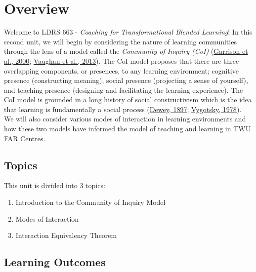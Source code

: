 \documentclass[
]{book}
\providecommand{\tightlist}{%
  \setlength{\itemsep}{0pt}\setlength{\parskip}{0pt}}
\begin{document}
\hypertarget{overview}{%
\section*{Overview}\label{overview}}

Welcome to LDRS 663 - \emph{Coaching for Transformational Blended Learning}! In this second unit, we will begin by considering the nature of learning communities through the lens of a model called the \emph{Community of Inquiry (CoI)} (\href{https://www.sciencedirect.com/science/article/pii/S1096751600000166?}{Garrison et al., 2000}; \href{http://www.aupress.ca/index.php/books/120229}{Vaughan et al., 2013}). The CoI model proposes that there are three overlapping components, or presences, to any learning environment; cognitive presence (constructing meaning), social presence (projecting a sense of yourself), and teaching presence (designing and facilitating the learning experience). The CoI model is grounded in a long history of social constructivism which is the idea that learning is fundamentally a social process (\href{https://en.wikisource.org/wiki/My_Pedagogic_Creed}{Dewey, 1897}; \href{https://twu.idm.oclc.org/login?url=http://search.ebscohost.com/login.aspx?direct=true\&db=cat05965a\&AN=alc.191437\&site=eds-live}{Vygotsky, 1978}). We will also consider various modes of interaction in learning environments and how these two models have informed the model of teaching and learning in TWU FAR Centres.

\hypertarget{topics}{%
\subsection*{Topics}\label{topics}}

This unit is divided into 3 topics:

\begin{enumerate}
\def\labelenumi{\arabic{enumi}.}
\tightlist
\item
  Introduction to the Community of Inquiry Model\\
\item
  Modes of Interaction\\
\item
  Interaction Equivalency Theorem
\end{enumerate}

\hypertarget{learning-outcomes}{%
\subsection*{Learning Outcomes}\label{learning-outcomes}}
\end{document}
